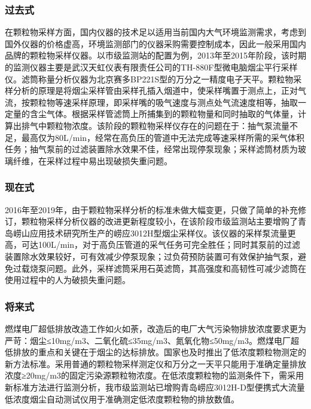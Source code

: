 \documentclass[
]{book}
\begin{document}
\hypertarget{ux8fc7ux53bbux5f0f-1}{%
\subsubsection{过去式}\label{ux8fc7ux53bbux5f0f-1}}

在颗粒物采样方面，国内仪器的技术足以适用当前国内大气环境监测需求，考虑到国外仪器的价格虚高，环境监测部门的仪器采购需要控制成本，因此一般采用国内品牌的颗粒物采样仪器。以市级监测站的配置为例，2013年至2015年阶段，该时期的监测仪器主要是武汉天虹仪表有限责任公司的TH-880F型微电脑烟尘平行采样仪。滤筒称量分析仪器为北京赛多BP221S型的万分之一精度电子天平。颗粒物采样分析的原理是将烟尘采样管由采样孔插入烟道中，使采样嘴置于测点上，正对气流，按颗粒物等速采样原理，即采样嘴的吸气速度与测点处气流速度相等，抽取一定量的含尘气体。根据采样管滤筒上所捕集到的颗粒物量和同时抽取的气体量，计算出排气中颗粒物浓度。该阶段的颗粒物采样仪存在的问题在于：抽气泵流量不足，最高仅为80L/min，经常在高负压的管道中无法完成等速采样所需的采气体积任务；抽气泵前的过滤装置除水效果不佳，经常出现停泵现象；采样滤筒材质为玻璃纤维，在采样过程中易出现破损失重问题。

\hypertarget{ux73b0ux5728ux5f0f-1}{%
\subsubsection{现在式}\label{ux73b0ux5728ux5f0f-1}}

2016年至2019年，由于颗粒物采样分析的标准未做大幅变更，只做了简单的补充修订，颗粒物采样分析仪器的改进更新程度较小，在该阶段市级监测站主要增购了青岛崂山应用技术研究所生产的崂应3012H型烟尘采样仪。该仪器的采样泵流量更高，可达100L/min，对于高负压管道的采气任务可完全胜任；同时其泵前的过滤装置除水效果较好，可有效减少停泵现象；过负荷预防装置可有效保护抽气泵，避免过载烧泵问题。此外，采样滤筒采用石英滤筒，其高强度和高韧性可减少滤筒在使用过程中的人为破损失重问题。

\hypertarget{ux5c06ux6765ux5f0f-1}{%
\subsubsection{将来式}\label{ux5c06ux6765ux5f0f-1}}

燃煤电厂超低排放改造工作如火如荼，改造后的电厂大气污染物排放浓度要求更为严苛：烟尘≤10mg/m3、二氧化硫≤35mg/m3、氮氧化物≤50mg/m3。燃煤电厂超低排放的重点和关键在于烟尘的达标排放。国家也及时推出了低浓度颗粒物测定的新方法标准。采用普通的颗粒物采样测定仪和万分之一天平只能用于准确定量排放浓度≥20mg/m3的固定污染源颗粒物浓度。在低浓度颗粒物的监测条件下，需采用新标准方法进行监测分析，我市级监测站已增购青岛崂应3012H-D型便携式大流量低浓度烟尘自动测试仪用于准确测定低浓度颗粒物的排放数值。
\end{document}
